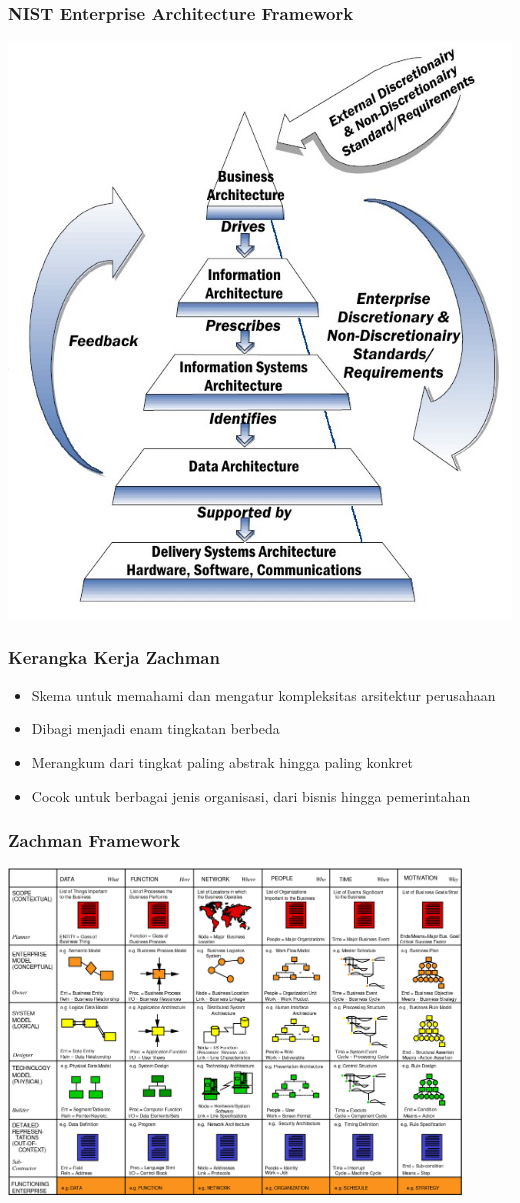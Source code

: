 \documentclass{beamer}
\begin{document}
	{
		\begin{frame}
			\frametitle{NIST Enterprise Architecture Framework}
			\begin{center}
				\includegraphics[width=.60\textwidth]{../figures/nist}
			\end{center}
		\end{frame}
	}
	
	\begin{frame}
		\frametitle{Kerangka Kerja Zachman}
		\begin{itemize}
			\item Skema untuk memahami dan mengatur kompleksitas arsitektur perusahaan
			\item Dibagi menjadi enam tingkatan berbeda
			\item Merangkum dari tingkat paling abstrak hingga paling konkret
			\item Cocok untuk berbagai jenis organisasi, dari bisnis hingga pemerintahan
		\end{itemize}
	\end{frame}
	
	{
		\begin{frame}
			\frametitle{Zachman Framework}
			\begin{center}
				\includegraphics[width=0.9\textwidth]{../figures/zachman}
			\end{center}
		\end{frame}
	}
\end{document}
